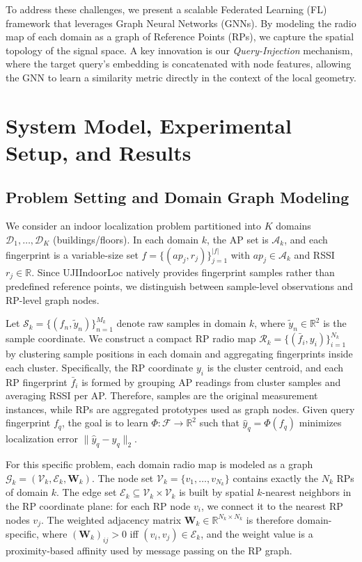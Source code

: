 \documentclass[conference]{IEEEtran}
\begin{document}
To address these challenges, we present a scalable Federated Learning (FL) framework that leverages Graph Neural Networks (GNNs). By modeling the radio map of each domain as a graph of Reference Points (RPs), we capture the spatial topology of the signal space. A key innovation is our \textit{Query-Injection} mechanism, where the target query's embedding is concatenated with node features, allowing the GNN to learn a similarity metric directly in the context of the local geometry.

\section{System Model, Experimental Setup, and Results}

\subsection{Problem Setting and Domain Graph Modeling}
We consider an indoor localization problem partitioned into $K$ domains $\mathcal{D}_1,\dots,\mathcal{D}_K$ (buildings/floors). In each domain $k$, the AP set is $\mathcal{A}_k$, and each fingerprint is a variable-size set $f=\{(ap_j,r_j)\}_{j=1}^{|f|}$ with $ap_j\in\mathcal{A}_k$ and RSSI $r_j\in\mathbb{R}$. Since UJIIndoorLoc natively provides fingerprint samples rather than predefined reference points, we distinguish between sample-level observations and RP-level graph nodes.

Let $\mathcal{S}_k=\{(f_n,\tilde y_n)\}_{n=1}^{M_k}$ denote raw samples in domain $k$, where $\tilde y_n\in\mathbb{R}^2$ is the sample coordinate. We construct a compact RP radio map $\mathcal{R}_k=\{(\bar f_i,y_i)\}_{i=1}^{N_k}$ by clustering sample positions in each domain and aggregating fingerprints inside each cluster. Specifically, the RP coordinate $y_i$ is the cluster centroid, and each RP fingerprint $\bar f_i$ is formed by grouping AP readings from cluster samples and averaging RSSI per AP. Therefore, samples are the original measurement instances, while RPs are aggregated prototypes used as graph nodes. Given query fingerprint $f_q$, the goal is to learn $\Phi:\mathcal{F}\rightarrow\mathbb{R}^2$ such that $\hat y_q=\Phi(f_q)$ minimizes localization error $\|\hat y_q-y_q\|_2$.

For this specific problem, each domain radio map is modeled as a graph $\mathcal{G}_k=(\mathcal{V}_k,\mathcal{E}_k,\mathbf{W}_k)$. The node set $\mathcal{V}_k=\{v_1,\dots,v_{N_k}\}$ contains exactly the $N_k$ RPs of domain $k$. The edge set $\mathcal{E}_k\subseteq\mathcal{V}_k\times\mathcal{V}_k$ is built by spatial $k$-nearest neighbors in the RP coordinate plane: for each RP node $v_i$, we connect it to the nearest RP nodes $v_j$. The weighted adjacency matrix $\mathbf{W}_k\in\mathbb{R}^{N_k\times N_k}$ is therefore domain-specific, where $(\mathbf{W}_k)_{ij}>0$ iff $(v_i,v_j)\in\mathcal{E}_k$, and the weight value is a proximity-based affinity used by message passing on the RP graph.
\end{document}
